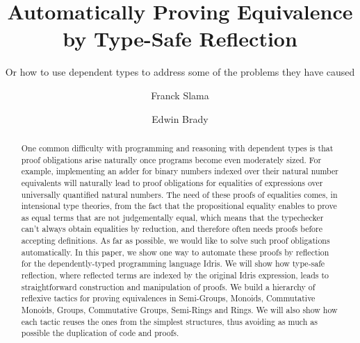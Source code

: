 \documentclass{llncs}
\begin{document}
%
\pagestyle{headings}  %

\mainmatter              %
%
\title{Automatically Proving Equivalence by Type-Safe Reflection}
\subtitle{Or how to use dependent types to address some of the problems they have caused}
%
%
\author{Franck Slama \and Edwin Brady}

\maketitle              %

\begin{abstract}
One common difficulty with programming and reasoning with dependent types is that proof obligations arise naturally once programs become even moderately sized. For example, implementing an adder for binary numbers indexed over their natural number equivalents will naturally lead to proof obligations for equalities of expressions over universally quantified natural numbers. The need of these proofs of equalities comes, in intensional type theories, from the fact that the propositional equality enables to prove as equal terms that are not judgementally equal, which means that the typechecker can't always obtain equalities by reduction, and therefore often needs proofs before accepting definitions.
As far as possible, we would like to solve such proof obligations automatically. In this paper, we show one way to automate these proofs by reflection for the dependently-typed programming language Idris. We will show how type-safe reflection, where reflected terms are indexed by the original Idris expression, leads to straightforward construction and manipulation of proofs. We build a hierarchy of reflexive tactics for proving equivalences in Semi-Groups, Monoids, Commutative Monoids, Groups, Commutative Groups, Semi-Rings and Rings. We will also show how each tactic reuses the ones from the simplest structures, thus avoiding as much as possible the duplication of code and proofs.
\end{abstract}
%












\end{document}
